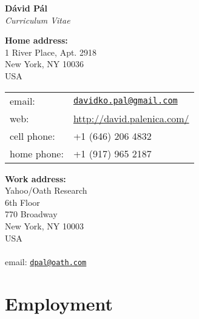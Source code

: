 \documentclass[9pt]{article}
\begin{document}
\begin{center}
{\huge \textbf{D\'avid P\'al}} \\[0.2cm]
\emph{Curriculum Vitae}
\end{center}

\vspace{0.2cm}

%
\noindent
\begin{minipage}[t]{10cm}
\textbf{Home address:} \\
1 River Place, Apt. 2918 \\
New York, NY 10036 \\
USA \\

\begin{tabular}{@{}ll}
email:       & \href{mailto:davidko.pal@gmail.com}{\texttt{davidko.pal@gmail.com}} \\
web:         & \url{http://david.palenica.com/} \\
cell phone:  & +1 (646) 206 4832 \\
home phone:  & +1 (917) 965 2187 \\
\end{tabular}
\end{minipage}
%
\begin{minipage}[t]{10cm}
\textbf{Work address:} \\
Yahoo/Oath Research \\
6th Floor \\
770 Broadway \\
New York, NY 10003 \\
USA \\
\\
email: \href{mailto:dpal@oath.com}{\texttt{dpal@oath.com}} \\
\end{minipage}

\section*{Employment}
\end{document}
